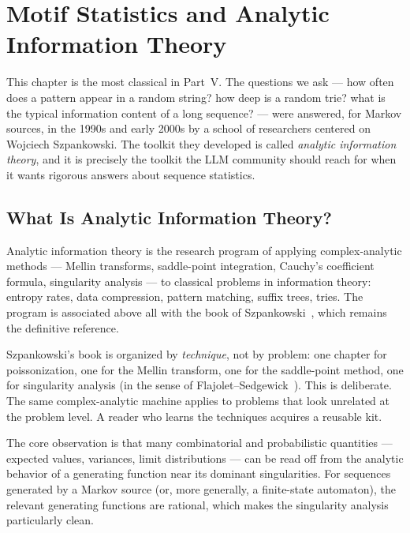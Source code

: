 \chapter{Motif Statistics and Analytic Information Theory}
\label{ch17}

This chapter is the most classical in Part~V. The questions we ask --- how often does a pattern appear in a random string? how deep is a random trie? what is the typical information content of a long sequence? --- were answered, for Markov sources, in the 1990s and early 2000s by a school of researchers centered on Wojciech Szpankowski. The toolkit they developed is called \emph{analytic information theory}, and it is precisely the toolkit the LLM community should reach for when it wants rigorous answers about sequence statistics.

\section{What Is Analytic Information Theory?}
\label{ch17:ait}

Analytic information theory is the research program of applying complex-analytic methods --- Mellin transforms, saddle-point integration, Cauchy's coefficient formula, singularity analysis --- to classical problems in information theory: entropy rates, data compression, pattern matching, suffix trees, tries. The program is associated above all with the book of Szpankowski~\cite{Szpankowski2001}, which remains the definitive reference.

\begin{remark}
Szpankowski's book is organized by \emph{technique}, not by problem: one chapter for poissonization, one for the Mellin transform, one for the saddle-point method, one for singularity analysis (in the sense of Flajolet--Sedgewick~\cite{FlajoletSedgewick2009}). This is deliberate. The same complex-analytic machine applies to problems that look unrelated at the problem level. A reader who learns the techniques acquires a reusable kit.
\end{remark}

The core observation is that many combinatorial and probabilistic quantities --- expected values, variances, limit distributions --- can be read off from the analytic behavior of a generating function near its dominant singularities. For sequences generated by a Markov source (or, more generally, a finite-state automaton), the relevant generating functions are rational, which makes the singularity analysis particularly clean.

